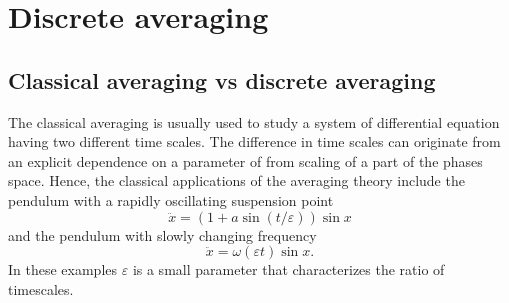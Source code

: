 \documentclass[a4paper,12pt]{article}
\begin{document}
\section{Discrete averaging\label{Se:discreteav}}
\subsection{Classical averaging vs discrete averaging}

The classical averaging is usually used to study a system of differential equation
having two different time scales. The difference in time scales can originate
from an explicit dependence on a parameter of from scaling of a part of the phases space.
Hence, the classical applications of the averaging theory include the pendulum with a rapidly oscillating 
suspension point
\[
\ddot x=(1+a\sin(t/\varepsilon))\sin x
\]
and the pendulum with slowly changing frequency
\[
\ddot x=\omega(\varepsilon t)\sin x.
\]
In these examples $\varepsilon$ is a small parameter that characterizes
the ratio of timescales.
\end{document}
